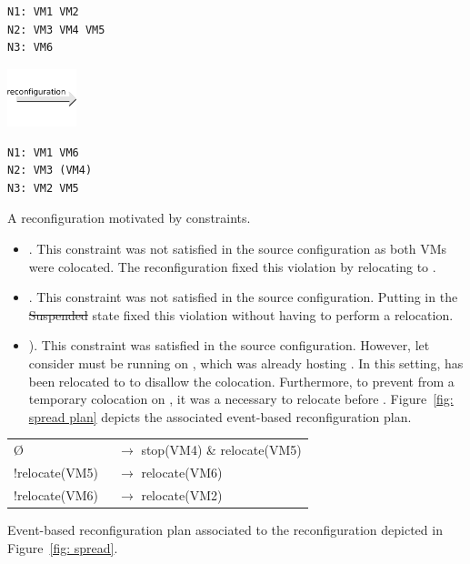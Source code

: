 \begin{reconfiguration}
\centering
\begin{minipage}[b]{0.40\textwidth}
\begin{lstlisting}
N1: VM1 VM2
N2: VM3 VM4 VM5
N3: VM6
\end{lstlisting}
\end{minipage}
\begin{minipage}[b]{2cm}
\includegraphics[width=2cm]{img/arrow_reconfiguration}
\end{minipage}
\begin{minipage}[b]{0.40\textwidth}
\begin{lstlisting}
N1: VM1 VM6
N2: VM3 (VM4)
N3: VM2 VM5
\end{lstlisting}
\end{minipage}
\caption{A reconfiguration motivated by  constraints.}\label{fig: spread}
\end{reconfiguration}

\begin{itemize}

\item {}. This constraint was not satisfied in the source configuration as both VMs were colocated.
%
The reconfiguration fixed this violation by relocating  to .

\item {}. This constraint was not satisfied in the source configuration.
Putting  in the \st{Suspended} state fixed this violation without having to perform a relocation.

\item {}). This constraint was satisfied in the source configuration. However, let consider
 must be running on , which was already hosting . In this setting, 
has been relocated to  to disallow the colocation. Furthermore, to prevent from a temporary colocation on , it was a necessary to relocate  before . Figure~\ref{fig: spread plan} depicts the associated event-based reconfiguration plan.
\end{itemize}


\begin{reconfPlan}[htb]
\centering
\begin{tabular}{ll}
\O & $\rightarrow$ stop(VM4) \& relocate(VM5)\\
!relocate(VM5)\ & $\rightarrow$ relocate(VM6)\\
!relocate(VM6)\ & $\rightarrow$ relocate(VM2)
\end{tabular}
\caption{Event-based reconfiguration plan associated to the reconfiguration depicted in Figure~\ref{fig: spread}.}\label{fig: spread plan}
\end{reconfPlan}


